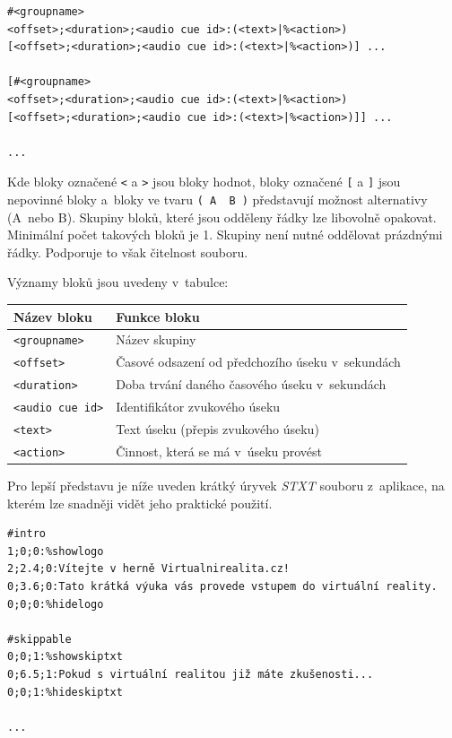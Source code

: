 \begin{verbatim}
#<groupname>
<offset>;<duration>;<audio cue id>:(<text>|%<action>)
[<offset>;<duration>;<audio cue id>:(<text>|%<action>)] ...

[#<groupname>
<offset>;<duration>;<audio cue id>:(<text>|%<action>)
[<offset>;<duration>;<audio cue id>:(<text>|%<action>)]] ...

...
\end{verbatim}

Kde bloky označené \texttt{\textless{}} a \texttt{\textgreater{}} jsou
bloky hodnot, bloky označené \texttt{{[}} a \texttt{{]}} jsou nepovinné
bloky a~bloky ve tvaru \texttt{(\ A\ \textbar{}\ B\ )} představují
možnost alternativy (A~nebo B). Skupiny bloků, které jsou odděleny řádky
lze libovolně opakovat. Minimální počet takových bloků je 1. Skupiny
není nutné oddělovat prázdnými řádky. Podporuje to však čitelnost souboru.

\newpage

Významy bloků jsou uvedeny v~tabulce:


\extrarowsep=4pt\begin{longtabu}{XX}
\toprule
Název bloku & Funkce bloku\tabularnewline
\midrule
\endhead
\texttt{\textless{}groupname\textgreater{}} & Název
skupiny\tabularnewline
\texttt{\textless{}offset\textgreater{}} & Časové odsazení od
předchozího úseku v~sekundách\tabularnewline
\texttt{\textless{}duration\textgreater{}} & Doba trvání daného časového
úseku v~sekundách\tabularnewline
\texttt{\textless{}audio\ cue\ id\textgreater{}} & Identifikátor
zvukového úseku\tabularnewline
\texttt{\textless{}text\textgreater{}} & Text úseku (přepis zvukového
úseku)\tabularnewline
\texttt{\textless{}action\textgreater{}} & Činnost, která se má v~úseku
provést\tabularnewline
\bottomrule
\end{longtabu}

Pro lepší představu je níže uveden krátký úryvek \emph{STXT} souboru
z~aplikace, na kterém lze snadněji vidět jeho praktické použití.

\begin{verbatim}
#intro
1;0;0:%showlogo
2;2.4;0:Vítejte v herně Virtualnirealita.cz!
0;3.6;0:Tato krátká výuka vás provede vstupem do virtuální reality.
0;0;0:%hidelogo

#skippable
0;0;1:%showskiptxt
0;6.5;1:Pokud s virtuální realitou již máte zkušenosti...
0;0;1:%hideskiptxt

...
\end{verbatim}

